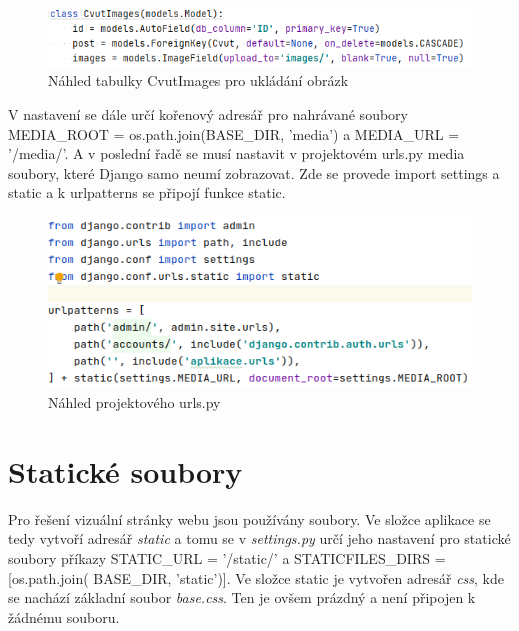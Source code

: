 \begin{figure}[H] \centering
    \includegraphics[width=430pt]{./pictures/9-db-cvutimages.PNG}
    \caption[Náhled tabulky CvutImages pro ukládání obrázků]{Náhled tabulky CvutImages pro ukládání obrázk}
	\label{fig:Náhled tabulky CvutImages pro ukládání obrázk}              
\end{figure}


V nastavení se dále určí kořenový adresář pro nahrávané soubory
MEDIA\_ROOT = os.path.join(BASE\_DIR, 'media') a
MEDIA\_URL = '/media/'.  A v poslední řadě se musí nastavit v
projektovém urls.py media soubory, které Django samo neumí
zobrazovat. Zde se provede import settings a static a k urlpatterns se
připojí funkce static.

\begin{figure}[H] \centering
    \includegraphics[width=380pt]{./pictures/10-media-urlspy.PNG}
    \caption[Náhled projektového urls.py]{Náhled projektového urls.py}
	\label{fig:Náhled projektového urls.py}              
\end{figure}

\newpage

\section{Statické soubory}

Pro řešení vizuální stránky webu jsou používány  soubory. Ve složce
aplikace se tedy vytvoří adresář \emph{static} a tomu se v \emph{settings.py} 
určí jeho nastavení pro statické soubory příkazy STATIC\_URL =
  '/static/' a STATICFILES\_DIRS = [os.path.join( BASE\_DIR,
    'static')]. Ve složce static je vytvořen adresář \emph{css}, kde se
nachází základní  soubor \emph{base.css}. Ten je ovšem prázdný a není
připojen k žádnému  souboru.

